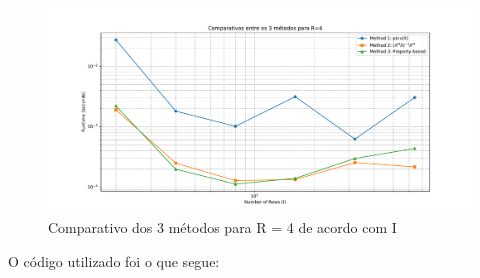 \documentclass[a4paper, 12pt]{article}
\begin{document}
	\begin{figure}
		\centering
		\includegraphics[width=\linewidth]{images/3met_r4.pdf}
		\caption{Comparativo dos 3 métodos para R = 4 de acordo com I}
		\label{fig:3metr4}
	\end{figure}
	
	O código utilizado foi o que segue:
	
\end{document}

